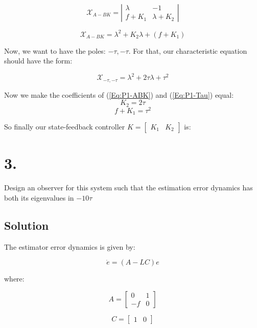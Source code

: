 \documentclass[10pt,a4paper]{article}
\begin{document}
\[ \mathcal{X}_{A-BK} =  \left | 
\begin{matrix}
\lambda & -1 \\
f + K_{1} & \lambda + K_{2}
\end{matrix}
\right | 
\]

\begin{equation} 
\mathcal{X}_{A-BK} =
\lambda^{2} + K_{2}\lambda + (f + K_{1})
\label{Eq:P1-ABK}
\end{equation}

Now, we want to have the poles: $-\tau, -\tau$. For that, our characteristic equation should have the form:

\begin{equation} \mathcal{X}_{-\tau, -\tau} =
\lambda^{2} +2\tau \lambda + \tau^{2} 
\label{Eq:P1-Tau}
\end{equation}

Now we make the coefficients of (\ref{Eq:P1-ABK}) and (\ref{Eq:P1-Tau}) equal:
\[ K_{2} = 2\tau \]
\[ f + K_{1} = \tau^{2} \]

So finally our state-feedback controller $K = \begin{bmatrix}K_{1} & K_{2}\end{bmatrix}$ is:

\begin{center}
\end{center}

\section*{3.}
Design an observer for this system such that the estimation error dynamics has both its eigenvalues in $-10\tau$

\subsection*{Solution}
The estimator error dynamics is given by:

\[ \dot{e} = (A-LC)e \]

where:

\[A = 
\begin{bmatrix}
0 & 1 \\
-f & 0
\end{bmatrix}
\]

\[
C =
\begin{bmatrix}
1 & 0 \end{bmatrix}
\]
\end{document}
